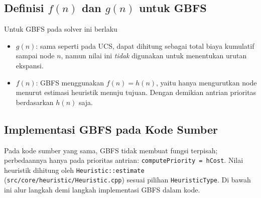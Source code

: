 \subsection{Definisi $f(n)$ dan $g(n)$ untuk GBFS}
Untuk GBFS pada solver ini berlaku
\begin{itemize}
    \item $g(n)$: sama seperti pada UCS, dapat dihitung sebagai total biaya kumulatif sampai node $n$, namun nilai ini \emph{tidak} digunakan untuk menentukan urutan ekspansi.
    \item $f(n)$: GBFS menggunakan $f(n)=h(n)$, yaitu hanya mengurutkan node menurut estimasi heuristik menuju tujuan. Dengan demikian antrian prioritas berdasarkan $h(n)$ saja.
\end{itemize}

\subsection{Implementasi GBFS pada Kode Sumber}
Pada kode sumber yang sama, GBFS tidak membuat fungsi terpisah; perbedaannya hanya pada prioritas antrian: \texttt{computePriority = hCost}. Nilai heuristik dihitung oleh \texttt{Heuristic::estimate} (\texttt{src/core/heuristic/Heuristic.cpp}) sesuai pilihan \texttt{HeuristicType}. Di bawah ini alur langkah demi langkah implementasi GBFS dalam kode.


